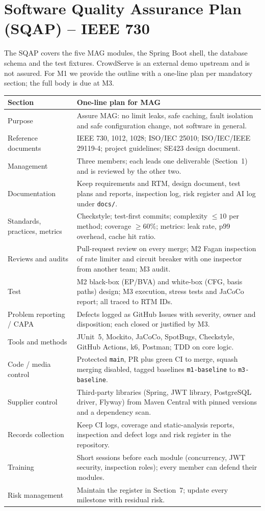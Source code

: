 \documentclass[11pt,a4paper]{article}
\begin{document}
\section{Software Quality Assurance Plan (SQAP) -- IEEE 730}
The SQAP covers the five MAG modules, the Spring Boot shell, the database schema and the test fixtures. CrowdServe is an external demo upstream and is not assured. For M1 we provide the outline with a one-line plan per mandatory section; the full body is due at M3.

\begin{longtable}{L{3.8cm} L{10.8cm}}
\toprule
\textbf{Section} & \textbf{One-line plan for MAG} \\
\midrule
\endhead
Purpose & Assure MAG: no limit leaks, safe caching, fault isolation and safe configuration change, not software in general. \\
Reference documents & IEEE 730, 1012, 1028; ISO/IEC 25010; ISO/IEC/IEEE 29119-4; project guidelines; SE423 design document. \\
Management & Three members; each leads one deliverable (Section~1) and is reviewed by the other two. \\
Documentation & Keep requirements and RTM, design document, test plans and reports, inspection log, risk register and AI log under \texttt{docs/}. \\
Standards, practices, metrics & Checkstyle; test-first commits; complexity $\leq 10$ per method; coverage $\geq 60\%$; metrics: leak rate, p99 overhead, cache hit ratio. \\
Reviews and audits & Pull-request review on every merge; M2 Fagan inspection of rate limiter and circuit breaker with one inspector from another team; M3 audit. \\
Test & M2 black-box (EP/BVA) and white-box (CFG, basis paths) design; M3 execution, stress tests and JaCoCo report; all traced to RTM IDs. \\
Problem reporting / CAPA & Defects logged as GitHub Issues with severity, owner and disposition; each closed or justified by M3. \\
Tools and methods & JUnit~5, Mockito, JaCoCo, SpotBugs, Checkstyle, GitHub Actions, k6, Postman; TDD on core logic. \\
Code / media control & Protected \texttt{main}, PR plus green CI to merge, squash merging disabled, tagged baselines \texttt{m1-baseline} to \texttt{m3-baseline}. \\
Supplier control & Third-party libraries (Spring, JWT library, PostgreSQL driver, Flyway) from Maven Central with pinned versions and a dependency scan. \\
Records collection & Keep CI logs, coverage and static-analysis reports, inspection and defect logs and risk register in the repository. \\
Training & Short sessions before each module (concurrency, JWT security, inspection roles); every member can defend their modules. \\
Risk management & Maintain the register in Section~7; update every milestone with residual risk. \\
\bottomrule
\end{longtable}
\end{document}
